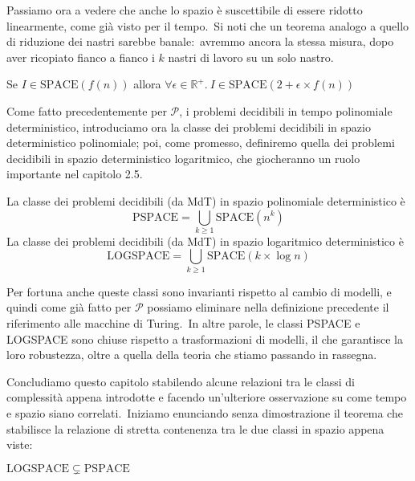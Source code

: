 \medskip
\noindent Passiamo ora a vedere che anche lo spazio è suscettibile di essere ridotto linearmente, come già visto per il tempo.\
Si noti che un teorema analogo a quello di riduzione dei nastri sarebbe banale:\ avremmo ancora la stessa misura, dopo aver ricopiato fianco a fianco i $k$ nastri di lavoro su un solo nastro.\

\begin{theorem}
    \hfill

    Se $I \in \mathrm{SPACE}(f(n))$ allora $\forall \epsilon \in \mathbb{R}^+.\ I \in \mathrm{SPACE}(2 + \epsilon \times f(n))$
\end{theorem}

\noindent Come fatto precedentemente per $\mathcal{P}$, i problemi decidibili in tempo polinomiale deterministico, introduciamo ora la classe dei problemi decidibili in spazio deterministico polinomiale; poi, come promesso, definiremo quella dei problemi decidibili in spazio deterministico logaritmico, che giocheranno un ruolo importante nel capitolo 2.5.

\begin{definition}
    La classe dei problemi decidibili (da MdT) in spazio polinomiale deterministico è
    \[\mathrm{PSPACE} = \bigcup_{k \geq 1} \mathrm{SPACE}\left(n^k\right)\]
    La classe dei problemi decidibili (da MdT) in spazio logaritmico deterministico è
    \[\mathrm{LOGSPACE} = \bigcup_{k \geq 1} \mathrm{SPACE}(k \times \log n)\]
\end{definition}

\noindent Per fortuna anche queste classi sono invarianti rispetto al cambio di modelli, e quindi come già fatto per $\mathcal{P}$ possiamo eliminare nella definizione precedente il riferimento alle macchine di Turing.\
In altre parole, le classi PSPACE e LOGSPACE sono chiuse rispetto a trasformazioni di modelli, il che garantisce la loro robustezza, oltre a quella della teoria che stiamo passando in rassegna.\

Concludiamo questo capitolo stabilendo alcune relazioni tra le classi di complessità appena introdotte e facendo un'ulteriore osservazione su come tempo e spazio siano correlati.\
Iniziamo enunciando senza dimostrazione il teorema che stabilisce la relazione di stretta contenenza tra le due classi in spazio appena viste:

\begin{theorem}
    $\mathrm{LOGSPACE} \subsetneq \mathrm{PSPACE}$
\end{theorem}

